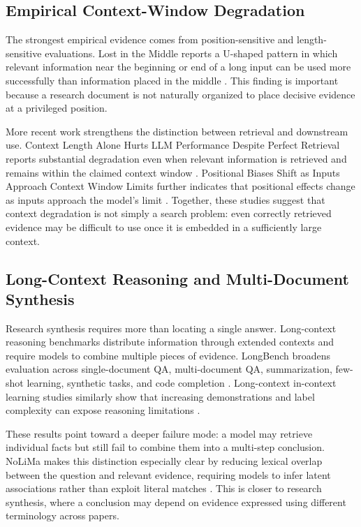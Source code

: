 \documentclass[manuscript,screen,oneside]{acmart}
\begin{document}
\subsection{Empirical Context-Window Degradation}\label{sec:degradation}
The strongest empirical evidence comes from position-sensitive and length-sensitive evaluations. Lost in the Middle reports a U-shaped pattern in which relevant information near the beginning or end of a long input can be used more successfully than information placed in the middle \cite{liu2024lost}. This finding is important because a research document is not naturally organized to place decisive evidence at a privileged position.

More recent work strengthens the distinction between retrieval and downstream use. Context Length Alone Hurts LLM Performance Despite Perfect Retrieval reports substantial degradation even when relevant information is retrieved and remains within the claimed context window \cite{du2025contextlength}. Positional Biases Shift as Inputs Approach Context Window Limits further indicates that positional effects change as inputs approach the model's limit \cite{veseli2025positional}. Together, these studies suggest that context degradation is not simply a search problem: even correctly retrieved evidence may be difficult to use once it is embedded in a sufficiently large context.

\subsection{Long-Context Reasoning and Multi-Document Synthesis}\label{sec:reasoning}
Research synthesis requires more than locating a single answer. Long-context reasoning benchmarks distribute information through extended contexts and require models to combine multiple pieces of evidence. LongBench broadens evaluation across single-document QA, multi-document QA, summarization, few-shot learning, synthetic tasks, and code completion \cite{bai2024longbench}. Long-context in-context learning studies similarly show that increasing demonstrations and label complexity can expose reasoning limitations \cite{li2025longcontexticl}.

These results point toward a deeper failure mode: a model may retrieve individual facts but still fail to combine them into a multi-step conclusion. NoLiMa makes this distinction especially clear by reducing lexical overlap between the question and relevant evidence, requiring models to infer latent associations rather than exploit literal matches \cite{modarressi2025nolima}. This is closer to research synthesis, where a conclusion may depend on evidence expressed using different terminology across papers.
\end{document}
